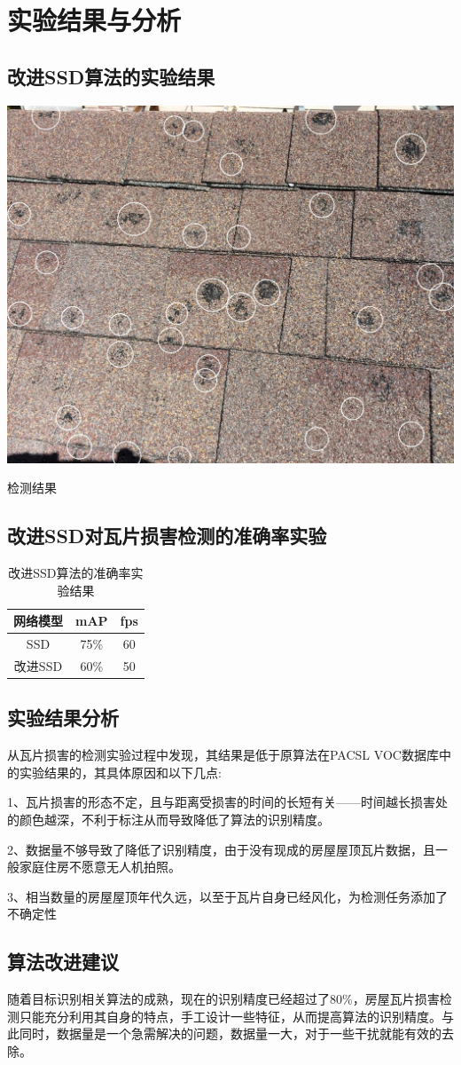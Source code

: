 \section{实验结果与分析}
\setcounter{figure}{0}

\subsection{改进SSD算法的实验结果}
\begin{uscfigure}
	\includegraphics[width=\textwidth]{./Pictures/result.jpg}	
	\caption{检测结果}
	\label{result}
\end{uscfigure}
\subsection{改进SSD对瓦片损害检测的准确率实验}
\begin{table}[htbp]
	\centering
	\caption{改进SSD算法的准确率实验结果}
	\label{}
	\begin{tabular}{ccc}
		\toprule
		网络模型 & mAP & fps\\
		\midrule
		SSD 	& 75\% & 60\\
		改进SSD  &  60\% & 50\\
		\bottomrule
	\end{tabular}
\end{table}
\subsection{实验结果分析}
从瓦片损害的检测实验过程中发现，其结果是低于原算法在PACSL VOC数据库中的实验结果的，其具体原因和以下几点:

1、瓦片损害的形态不定，且与距离受损害的时间的长短有关——时间越长损害处的颜色越深，不利于标注从而导致降低了算法的识别精度。

2、数据量不够导致了降低了识别精度，由于没有现成的房屋屋顶瓦片数据，且一般家庭住房不愿意无人机拍照。

3、相当数量的房屋屋顶年代久远，以至于瓦片自身已经风化，为检测任务添加了不确定性

\subsection{算法改进建议}
随着目标识别相关算法的成熟，现在的识别精度已经超过了80\%，房屋瓦片损害检测只能充分利用其自身的特点，手工设计一些特征，从而提高算法的识别精度。与此同时，数据量是一个急需解决的问题，数据量一大，对于一些干扰就能有效的去除。
